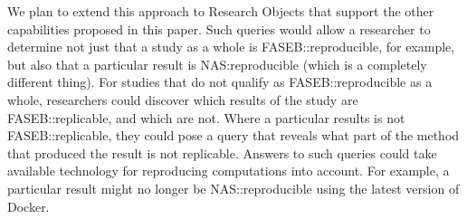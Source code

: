 We plan to extend this approach to Research Objects that support the other capabilities
	proposed in this paper.
Such queries would allow a researcher to determine not just that a study as a whole
	is FASEB::reproducible, for example, but also that a particular result
	is NAS:reproducible (which is a completely different thing).
For studies that do not qualify as FASEB::reproducible as a whole, researchers
	could discover which results of the study are FASEB::replicable, and which are not.
Where a particular results is not FASEB::replicable, they could pose a query
	that reveals what part of the method that produced the result is 
	not replicable.
Answers to such queries could take available technology for reproducing computations
	into account.
For example, a particular result might no longer be NAS::reproducible using the
	latest version of Docker.




